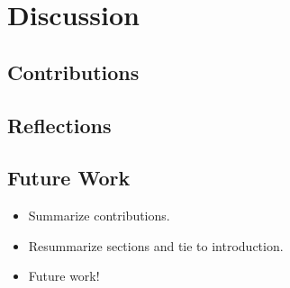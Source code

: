 \section{Discussion}
\subsection{Contributions}

\subsection{Reflections}

\subsection{Future Work}


\begin{itemize}
    \item Summarize contributions. 
    \item Resummarize sections and tie to introduction. 
    \item Future work! 
\end{itemize}